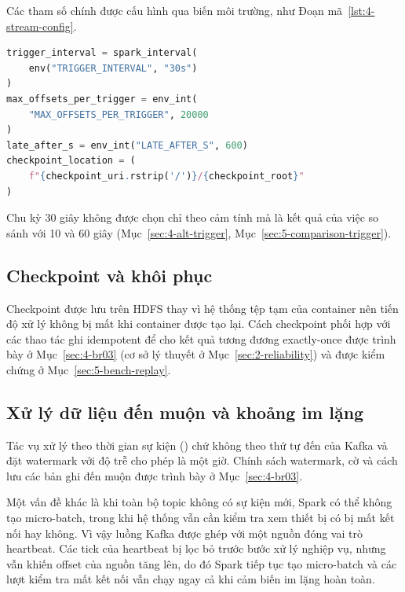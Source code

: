 Các tham số chính được cấu hình qua biến môi trường, như Đoạn mã~\ref{lst:4-stream-config}.

\begin{lstlisting}[language=Python, caption={Các tham số chính của đường streaming}, label={lst:4-stream-config}]
trigger_interval = spark_interval(
    env("TRIGGER_INTERVAL", "30s")
)
max_offsets_per_trigger = env_int(
    "MAX_OFFSETS_PER_TRIGGER", 20000
)
late_after_s = env_int("LATE_AFTER_S", 600)
checkpoint_location = (
    f"{checkpoint_uri.rstrip('/')}/{checkpoint_root}"
)
\end{lstlisting}

Chu kỳ 30 giây không được chọn chỉ theo cảm tính mà là kết quả của việc so sánh với 10 và 60 giây (Mục~\ref{sec:4-alt-trigger}, Mục~\ref{sec:5-comparison-trigger}).

\subsection{Checkpoint và khôi phục}

Checkpoint được lưu trên HDFS thay vì hệ thống tệp tạm của container nên tiến độ xử lý không bị mất khi container được tạo lại. Cách checkpoint phối hợp với các thao tác ghi idempotent để cho kết quả tương đương exactly-once được trình bày ở Mục~\ref{sec:4-br03} (cơ sở lý thuyết ở Mục~\ref{sec:2-reliability}) và được kiểm chứng ở Mục~\ref{sec:5-bench-replay}.

\subsection{Xử lý dữ liệu đến muộn và khoảng im lặng}

Tác vụ xử lý theo thời gian sự kiện () chứ không theo thứ tự đến của Kafka và đặt watermark với độ trễ cho phép là một giờ. Chính sách watermark, cờ  và cách lưu các bản ghi đến muộn được trình bày ở Mục~\ref{sec:4-br03}.

Một vấn đề khác là khi toàn bộ topic không có sự kiện mới, Spark có thể không tạo micro-batch, trong khi hệ thống vẫn cần kiểm tra xem thiết bị có bị mất kết nối hay không. Vì vậy luồng Kafka được ghép với một nguồn  đóng vai trò heartbeat. Các tick của heartbeat bị lọc bỏ trước bước xử lý nghiệp vụ, nhưng vẫn khiến offset của nguồn tăng lên, do đó Spark tiếp tục tạo micro-batch và các lượt kiểm tra mất kết nối vẫn chạy ngay cả khi cảm biến im lặng hoàn toàn.



